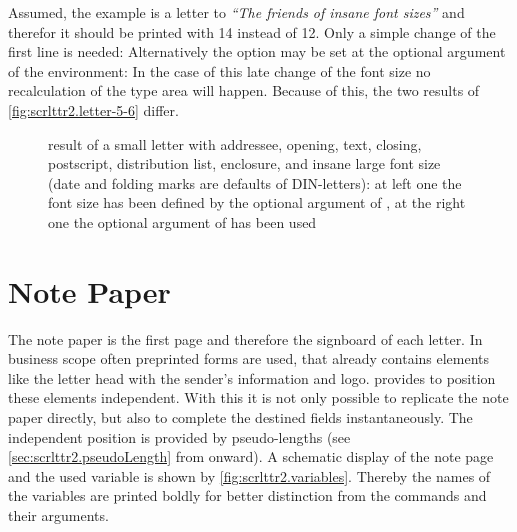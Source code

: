 \begin{Example}
  Assumed, the example is a letter to \emph{``The friends of insane font
    sizes''} and therefor it should be printed with 14 instead of
  12. Only a simple change of the first line is needed:%
  Alternatively the option may be set at the optional argument of the
   environment:%
  In the case of this late change of the font size no recalculation of the
  type area will happen. Because of this, the two results of
  \autoref{fig:scrlttr2.letter-5-6} differ.
  \begin{figure}
    \centering
    \quad
    \caption[{Example: letter with addressee, opening, text,
        closing, postscript, distribution list, enclosure, and insane large
        font size}]{%
        result of a small letter with addressee, opening, text, closing,
        postscript, distribution list, enclosure, and insane large font size
        (date and folding marks are defaults of DIN-letters): at left one the
        font size has been defined by the optional argument of
        , at the right one the optional argument of
         has been used}
    \label{fig:scrlttr2.letter-5-6}
  \end{figure}
\end{Example}
%
\EndIndexGroup
%
\EndIndexGroup


\section{Note Paper}
\BeginIndexGroup
{}%

The note paper is the first page and therefore the signboard of each
letter. In business scope often preprinted forms are used, that already
contains elements like the letter head with the sender's information and
logo. \KOMAScript{} provides to position these elements independent. With this
it is not only possible to replicate the note paper directly, but also to
complete the destined fields instantaneously. The independent position is
provided by pseudo-lengths (see \autoref{sec:scrlttr2.pseudoLength} from
 onward). A schematic display of the
note page and the used variable is shown by
\autoref{fig:scrlttr2.variables}. Thereby the names of the variables are
printed boldly for better distinction from the commands and their arguments.

